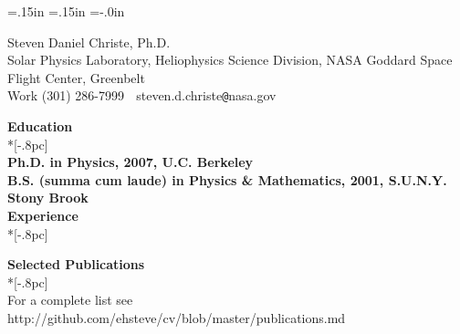 
\oddsidemargin=.15in
\evensidemargin=.15in
\textwidth=6in
\topmargin=-.0in
\textheight=9in
\parindent=0in

\renewcommand{\familydefault}{\sfdefault}

\newenvironment{myitemize*}%
  {\begin{itemize}%
    \setlength{\itemsep}{0pt}%
    \setlength{\parskip}{0pt}}%
  {\end{myitemize}}

\pagestyle{empty}



\begin{center}
{\Large Steven Daniel Christe, Ph.D.} \\[.5pc]
Solar Physics Laboratory, Heliophysics Science Division, NASA Goddard Space Flight Center, Greenbelt \\
Work (301) 286-7999 $\;$ steven.d.christe\verb|@|nasa.gov $\;$ \\[2pc]
\end{center}
\vspace{-0.2in}
{\large \bf Education} \\*[-.8pc]
\underline{\hspace{6in}} \\
{\bf Ph.D. in Physics, 2007, U.C. Berkeley} \\
{\bf B.S. (summa cum laude) in Physics \& Mathematics, 2001, S.U.N.Y. Stony Brook} \\

{\large \bf Experience} \\*[-.8pc]
\underline{\hspace{6in}}



{\large \bf Selected Publications} \\*[-.8pc]
\underline{\hspace{6in}} \\
For a complete list see http://github.com/ehsteve/cv/blob/master/publications.md




